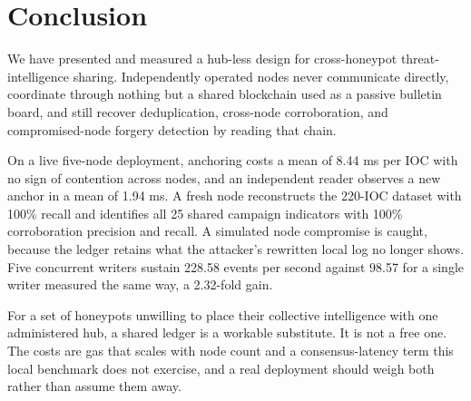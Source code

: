 \documentclass[conference]{IEEEtran}
\begin{document}
\section{Conclusion}

We have presented and measured a hub-less design for cross-honeypot threat-intelligence sharing. Independently operated nodes never communicate directly, coordinate through nothing but a shared blockchain used as a passive bulletin board, and still recover deduplication, cross-node corroboration, and compromised-node forgery detection by reading that chain.

On a live five-node deployment, anchoring costs a mean of 8.44 ms per IOC with no sign of contention across nodes, and an independent reader observes a new anchor in a mean of 1.94 ms. A fresh node reconstructs the 220-IOC dataset with 100\% recall and identifies all 25 shared campaign indicators with 100\% corroboration precision and recall. A simulated node compromise is caught, because the ledger retains what the attacker's rewritten local log no longer shows. Five concurrent writers sustain 228.58 events per second against 98.57 for a single writer measured the same way, a 2.32-fold gain.

For a set of honeypots unwilling to place their collective intelligence with one administered hub, a shared ledger is a workable substitute. It is not a free one. The costs are gas that scales with node count and a consensus-latency term this local benchmark does not exercise, and a real deployment should weigh both rather than assume them away.

\end{document}
